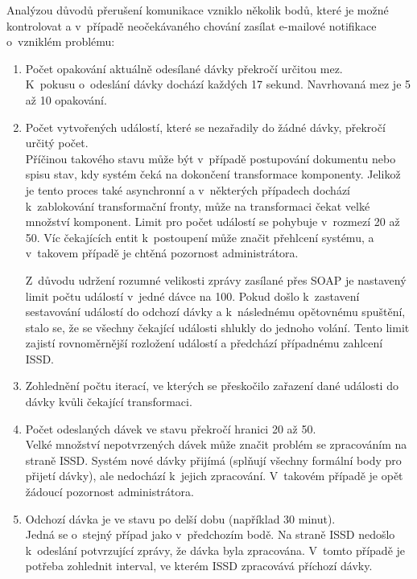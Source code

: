 \documentclass[
  master,
  field=ainfp,
  biblatex,
  language=czech,
  glossaries,
  theorems=false,
  index
]{kidiplom}
\begin{document}
Analýzou důvodů přerušení komunikace vzniklo několik bodů, které je možné kontrolovat a v~případě neočekávaného chování zasílat e-mailové notifikace o~vzniklém problému:
\begin{enumerate}
	\item Počet opakování aktuálně odesílané dávky překročí určitou mez.\\
	K~pokusu o~odeslání dávky dochází každých 17 sekund. Navrhovaná mez je 5 až 10 opakování.
	\item Počet vytvořených událostí, které se nezařadily do žádné dávky, překročí určitý počet.\\
	Příčinou takového stavu může být v~případě postupování dokumentu nebo spisu stav, kdy systém čeká na dokončení transformace komponenty. Jelikož je tento proces také asynchronní a v~některých případech dochází k~zablokování transformační fronty, může na transformaci čekat velké množství komponent. Limit pro počet událostí se pohybuje v~rozmezí 20 až 50. Víc čekajících entit k~postoupení může značit přehlcení systému, a v~takovem případě je chtěná pozornost administrátora.
		
	Z~důvodu udržení rozumné velikosti zprávy zasílané přes SOAP je nastavený limit počtu událostí v~jedné dávce na 100. Pokud došlo k~zastavení sestavování událostí do odchozí dávky a k~následnému opětovnému spuštění, stalo se, že se všechny čekající události shlukly do jednoho volání. Tento limit zajistí rovnoměrnější rozložení událostí a předchází případnému zahlcení ISSD.
	\item Zohlednění počtu iterací, ve kterých se přeskočilo zařazení dané události do dávky kvůli čekající transformaci.	
	\item Počet odeslaných dávek ve stavu  překročí hranici 20 až 50.\\
	Velké množství nepotvrzených dávek může značit problém se zpracováním na straně ISSD. Systém nové dávky přijímá (splňují všechny formální body pro přijetí dávky), ale nedochází k~jejich zpracování. V~takovém případě je opět žádoucí pozornost administrátora.
	\item Odchozí dávka je ve stavu  po delší dobu (například 30 minut).\\
	Jedná se o~stejný případ jako v~předchozím bodě. Na straně ISSD nedošlo k~odeslání potvrzující zprávy, že dávka byla zpracována. V~tomto případě je potřeba zohlednit interval, ve kterém ISSD zpracovává příchozí dávky.
\end{enumerate}
\end{document}
